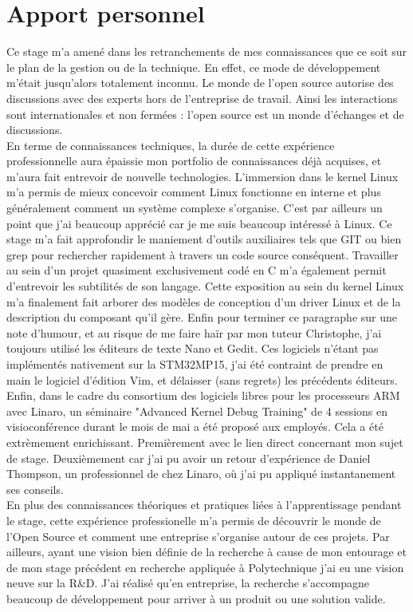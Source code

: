 
\section{Apport personnel}
\label{sec:personal_benefits}

Ce stage m'a amené dans les retranchements de mes connaissances que ce soit
sur le plan de la gestion ou de la technique. En effet, ce mode de
développement m'était jusqu'alors totalement inconnu. Le monde de l'open
source autorise des discussions avec des experts hors de l'entreprise de
travail. Ainsi les interactions sont internationales et non fermées : l'open
source est un monde d'échanges et de discussions. \\

En terme de connaissances techniques, la durée de cette expérience
professionnelle aura épaissie mon portfolio de connaissances déjà acquises, et
m'aura fait entrevoir de nouvelle technologies. L'immersion dans le kernel
Linux m'a permis de mieux concevoir comment Linux fonctionne en interne et
plus généralement comment un système complexe s'organise. C'est par ailleurs
un point que j'ai beaucoup apprécié car je me suis beaucoup intéressé à Linux.
Ce stage m'a fait approfondir le maniement d'outils auxiliaires tels que GIT
ou bien grep pour rechercher rapidement à travers un code source conséquent.
Travailler au sein d'un projet quasiment exclusivement codé en C m'a également
permit d'entrevoir les subtilités de son langage. Cette exposition au sein du
kernel Linux m'a finalement fait arborer des modèles de conception d'un driver
Linux et de la description du composant qu'il gère. Enfin pour terminer ce
paragraphe sur une note d'humour, et au risque de me faire haïr par mon tuteur
Christophe, j'ai toujours utilisé les éditeurs de texte Nano et Gedit. Ces
logiciels n'étant pas implémentés nativement sur la STM32MP15, j'ai été
contraint de prendre en main le logiciel d'édition Vim, et délaisser (sans
regrets) les précédents éditeurs. \\

Enfin, dans le cadre du consortium des logiciels libres pour les processeurs
ARM avec Linaro, un séminaire "Advanced Kernel Debug Training" de 4 sessions
en visioconférence durant le mois de mai a été proposé aux employés. Cela a
été extrèmement enrichissant. Premièrement avec le lien direct concernant mon
sujet de stage. Deuxièmement car j'ai pu avoir un retour d'expérience de
Daniel Thompson, un professionnel de chez Linaro, où j'ai pu appliqué
instantanement ses conseils. \\

En plus des connaissances théoriques et pratiques liées à l'apprentissage
pendant le stage, cette expérience professionelle m'a permis de découvrir le
monde de l'Open Source et comment une entreprise s'organise autour de ces
projets. Par ailleurs, ayant une vision bien définie de la recherche à cause
de mon entourage et de mon stage précédent en recherche appliquée à
Polytechnique j'ai eu une vision neuve sur la R\&D. J'ai réalisé qu'en
entreprise, la recherche s'accompagne beaucoup de développement pour arriver à
un produit ou une solution valide.

